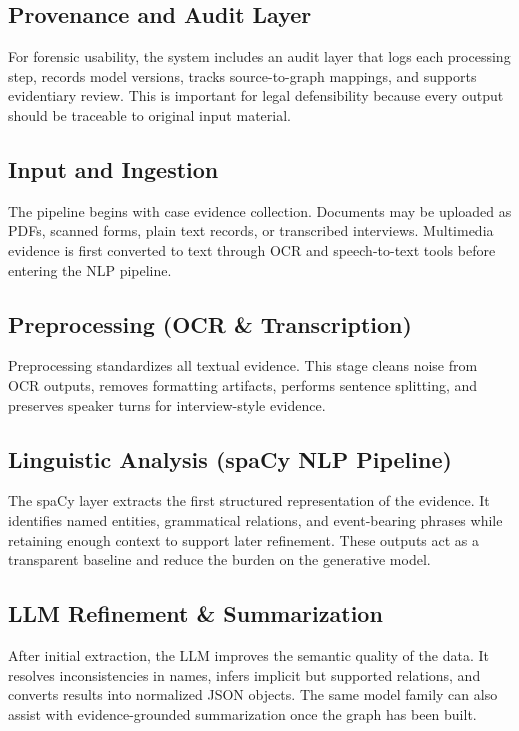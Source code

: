 \documentclass{ieeeaccess}
\begin{document}
\subsection{Provenance and Audit Layer}
For forensic usability, the system includes an audit layer that logs each processing step, records model versions, tracks source-to-graph mappings, and supports evidentiary review. This is important for legal defensibility because every output should be traceable to original input material.

\subsection*{\textbf{Input and Ingestion}}
The pipeline begins with case evidence collection. Documents may be uploaded as PDFs, scanned forms, plain text records, or transcribed interviews. Multimedia evidence is first converted to text through OCR and speech-to-text tools before entering the NLP pipeline.

\subsection*{\textbf{Preprocessing (OCR \& Transcription)}}
Preprocessing standardizes all textual evidence. This stage cleans noise from OCR outputs, removes formatting artifacts, performs sentence splitting, and preserves speaker turns for interview-style evidence.

\subsection*{\textbf{Linguistic Analysis (spaCy NLP Pipeline)}}
The spaCy layer extracts the first structured representation of the evidence. It identifies named entities, grammatical relations, and event-bearing phrases while retaining enough context to support later refinement. These outputs act as a transparent baseline and reduce the burden on the generative model.

\subsection*{\textbf{LLM Refinement \& Summarization}}
After initial extraction, the LLM improves the semantic quality of the data. It resolves inconsistencies in names, infers implicit but supported relations, and converts results into normalized JSON objects. The same model family can also assist with evidence-grounded summarization once the graph has been built.
\end{document}
